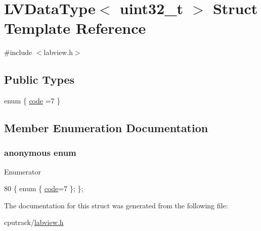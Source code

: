 \hypertarget{struct_l_v_data_type_3_01uint32__t_01_4}{}\section{L\+V\+Data\+Type$<$ uint32\+\_\+t $>$ Struct Template Reference}
\label{struct_l_v_data_type_3_01uint32__t_01_4}


{\ttfamily \#include $<$labview.\+h$>$}

\subsection*{Public Types}
\begin{DoxyCompactItemize}
\item 
enum \{ \hyperlink{struct_l_v_data_type_3_01uint32__t_01_4_ad101aefa4684203673886191c3dbf0f4a66459fcc338ee2ea39d3a2b70ba88b3d}{code} =7
 \}
\end{DoxyCompactItemize}


\subsection{Member Enumeration Documentation}
\subsubsection[{\texorpdfstring{anonymous enum}{anonymous enum}}]{\setlength{\rightskip}{0pt plus 5cm}anonymous enum}\hypertarget{struct_l_v_data_type_3_01uint32__t_01_4_ad101aefa4684203673886191c3dbf0f4}{}\label{struct_l_v_data_type_3_01uint32__t_01_4_ad101aefa4684203673886191c3dbf0f4}
\begin{Desc}
\item[Enumerator]\par
\begin{description}
\item[{\em 
code\hypertarget{struct_l_v_data_type_3_01uint32__t_01_4_ad101aefa4684203673886191c3dbf0f4a66459fcc338ee2ea39d3a2b70ba88b3d}{}\label{struct_l_v_data_type_3_01uint32__t_01_4_ad101aefa4684203673886191c3dbf0f4a66459fcc338ee2ea39d3a2b70ba88b3d}
}]\end{description}
\end{Desc}

\begin{DoxyCode}
80 \{ \textcolor{keyword}{enum} \{ \hyperlink{struct_l_v_data_type_3_01uint32__t_01_4_ad101aefa4684203673886191c3dbf0f4a66459fcc338ee2ea39d3a2b70ba88b3d}{code}=7 \}; \};
\end{DoxyCode}


The documentation for this struct was generated from the following file\+:\begin{DoxyCompactItemize}
\item 
cputrack/\hyperlink{labview_8h}{labview.\+h}\end{DoxyCompactItemize}
